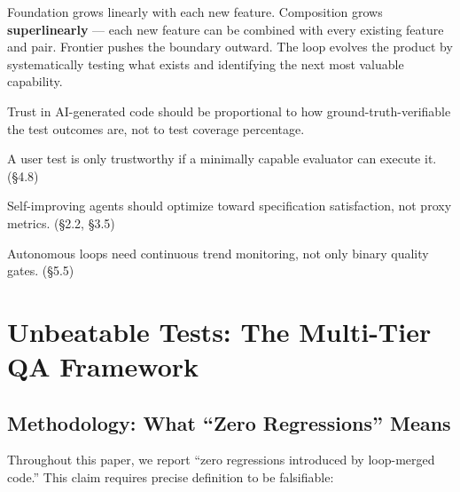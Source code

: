 \documentclass[11pt,a4paper]{article}
\begin{document}
Foundation grows linearly with each new feature. Composition grows \textbf{superlinearly} --- each new feature can be combined with every existing feature and pair. Frontier pushes the boundary outward. The loop evolves the product by systematically testing what exists and identifying the next most valuable capability.

\begin{tcolorbox}[principlebox, title=Design Principles]
\begin{description}[leftmargin=2.5em, style=nextline]
\item[P1. Ground-Truth Verification] Trust in AI-generated code should be proportional to how ground-truth-verifiable the test outcomes are, not to test coverage percentage.
\item[P2. Weakest-Evaluator] A user test is only trustworthy if a minimally capable evaluator can execute it. (\S4.8)
\item[P3. Spec-Anchored Improvement] Self-improving agents should optimize toward specification satisfaction, not proxy metrics. (\S2.2, \S3.5)
\item[P4. Drift-Before-Failure] Autonomous loops need continuous trend monitoring, not only binary quality gates. (\S5.5)
\end{description}
\end{tcolorbox}


\section{Unbeatable Tests: The Multi-Tier QA Framework}\label{sec:unbeatable-tests-the-multi-tier-qa-framework}

\subsection{Methodology: What ``Zero Regressions'' Means}\label{sec:methodology-what-zero-regressions-means}

Throughout this paper, we report ``zero regressions introduced by loop-merged code.'' This claim requires precise definition to be falsifiable:
\end{document}
